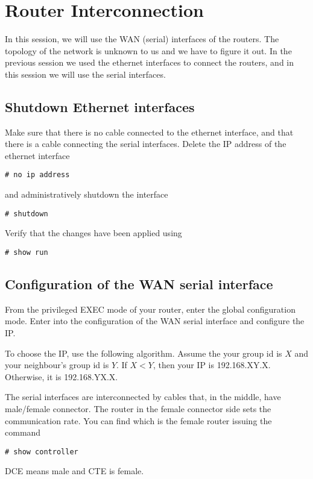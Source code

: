\section{Router Interconnection}
In this session, we will use the WAN (serial) interfaces of the routers.
The topology of the network is unknown to us and we have to figure it out.
In the previous session we used the ethernet interfaces to connect the routers, and in this session we will use the serial interfaces.

\subsection{Shutdown Ethernet interfaces}

Make sure that there is no cable connected to the ethernet interface, and that there is a cable connecting the serial interfaces.
Delete the IP address of the ethernet interface
\begin{lstlisting}
# no ip address
\end{lstlisting}
and administratively shutdown the interface
\begin{lstlisting}
# shutdown
\end{lstlisting}

Verify that the changes have been applied using
\begin{lstlisting}
# show run
\end{lstlisting}

\subsection{Configuration of the WAN serial interface}

From the privileged EXEC mode of your router, enter the global configuration mode.
Enter into the configuration of the WAN serial interface and configure the IP.

To choose the IP, use the following algorithm.
Assume the your group id is $X$ and your neighbour's group id is $Y$.
If $X<Y$, then your IP is 192.168.XY.X. Otherwise, it is 192.168.YX.X.

The serial interfaces are interconnected by cables that, in the middle, have male/female connector.
The router in the female connector side sets the communication rate.
You can find which is the female router issuing the command
\begin{lstlisting}
# show controller
\end{lstlisting}
DCE means male and CTE is female.

